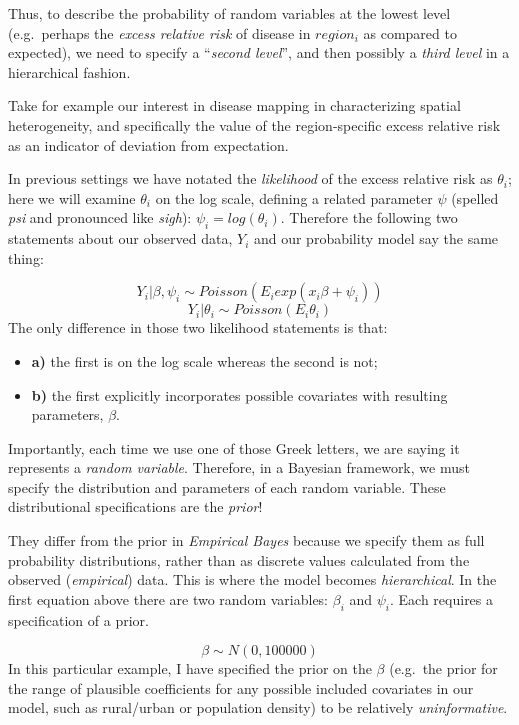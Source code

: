 \documentclass[
]{book}
\providecommand{\tightlist}{%
  \setlength{\itemsep}{0pt}\setlength{\parskip}{0pt}}
\begin{document}
Thus, to describe the probability of random variables at the lowest level (e.g.~perhaps the \emph{excess relative risk} of disease in \(region_i\) as compared to expected), we need to specify a ``\emph{second level}'', and then possibly a \emph{third level} in a hierarchical fashion.

Take for example our interest in disease mapping in characterizing spatial heterogeneity, and specifically the value of the region-specific excess relative risk as an indicator of deviation from expectation.

In previous settings we have notated the \emph{likelihood} of the excess relative risk as \(\theta_i\); here we will examine \(\theta_i\) on the log scale, defining a related parameter \(\psi\) (spelled \emph{psi} and pronounced like \emph{sigh}): \(\psi_i = log(\theta_i)\). Therefore the following two statements about our observed data, \(Y_i\) and our probability model say the same thing:

\[Y_i | \beta, \psi_i \sim Poisson(E_i exp(x_i \beta + \psi_i))\]
\[Y_i| \theta_i \sim Poisson(E_i \theta_i)\]
The only difference in those two likelihood statements is that:

\begin{itemize}
\tightlist
\item
  \textbf{a)} the first is on the log scale whereas the second is not;\\
\item
  \textbf{b)} the first explicitly incorporates possible covariates with resulting parameters, \(\beta\).
\end{itemize}

Importantly, each time we use one of those Greek letters, we are saying it represents a \emph{random variable}. Therefore, in a Bayesian framework, we must specify the distribution and parameters of each random variable. These distributional specifications are the \emph{prior}!

They differ from the prior in \emph{Empirical Bayes} because we specify them as full probability distributions, rather than as discrete values calculated from the observed (\emph{empirical}) data. This is where the model becomes \emph{hierarchical}. In the first equation above there are two random variables: \(\beta_i\) and \(\psi_i\). Each requires a specification of a prior.

\[\beta \sim N(0,100000)\]
In this particular example, I have specified the prior on the \(\beta\) (e.g.~the prior for the range of plausible coefficients for any possible included covariates in our model, such as rural/urban or population density) to be relatively \emph{uninformative}.
\end{document}
